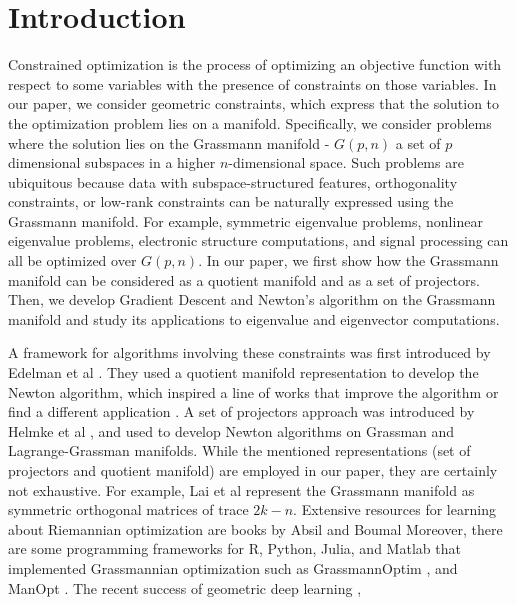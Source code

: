 \documentclass[11pt,a4paper]{report}
\begin{document}
\chapter{Introduction}
Constrained optimization is the process of optimizing an objective function with respect to some variables with the presence of constraints on those variables.
In our paper, we consider geometric constraints, which express that the solution to the optimization problem lies on a manifold.
Specifically, we consider problems where the solution lies on the Grassmann manifold - $G(p, n)$ a set of $p$ dimensional subspaces in a higher $n$-dimensional space.
Such problems are ubiquitous because data with subspace-structured features, orthogonality constraints, or low-rank constraints can be naturally expressed using the Grassmann manifold.
For example, symmetric eigenvalue problems, nonlinear eigenvalue problems, electronic structure computations, and signal processing can all be optimized over $G(p, n)$.
In our paper, we first show how the Grassmann manifold can be considered as a quotient manifold and as a set of projectors.
Then, we develop Gradient Descent and Newton’s algorithm on the Grassmann manifold and study its applications to eigenvalue and eigenvector computations.
\par
A framework for algorithms involving these constraints was first introduced by Edelman et al \cite{edelman_geometry_1998} .
They used a quotient manifold representation to develop the Newton algorithm, which inspired a line of works that improve the algorithm or find a different application \cite{hamm_grassmann_nodate} \cite{ma_flag_2020} \cite{johnsson_optimization_nodate} \cite{tripuraneni_averaging_2018}.
A set of projectors approach was introduced by Helmke et al \cite{helmke_newtons_2007}, and used to develop Newton algorithms on Grassman and Lagrange-Grassman manifolds.
While the mentioned representations (set of projectors and quotient manifold) are employed in our paper, they are certainly not exhaustive.
For example, Lai et al \cite{lai_simpler_2020} represent the Grassmann manifold as symmetric orthogonal matrices of trace $2k -n$.
Extensive resources for learning about Riemannian optimization are books by Absil \cite{AbsMahSep2008} and Boumal \cite{boumal2022intromanifolds}
Moreover, there are some programming frameworks for R, Python, Julia, and Matlab that implemented Grassmannian optimization such as GrassmannOptim \cite{adragni_grassmannoptim_2012}, and ManOpt \cite{JMLR:v17:16-177}.
The recent success of geometric deep learning \cite{DBLP:journals/corr/abs-2104-13478} \cite{masci_geodesic_2018}, 
\end{document}

